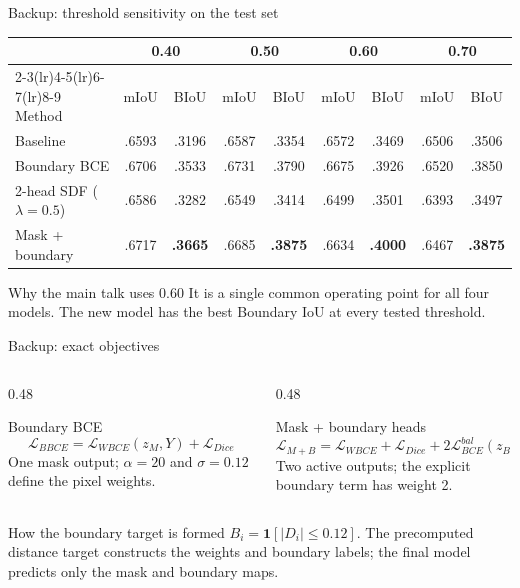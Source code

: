 \documentclass[aspectratio=169,10pt]{beamer}
\begin{document}
\begin{frame}{Backup: threshold sensitivity on the test set}
  \centering
  \small
  \setlength{\tabcolsep}{8pt}
  \begin{tabular}{@{}lcccccccc@{}}
    \toprule
    & \multicolumn{2}{c}{0.40} & \multicolumn{2}{c}{0.50}
    & \multicolumn{2}{c}{0.60} & \multicolumn{2}{c}{0.70} \\
    \cmidrule(lr){2-3}\cmidrule(lr){4-5}\cmidrule(lr){6-7}\cmidrule(lr){8-9}
    Method & mIoU & BIoU & mIoU & BIoU & mIoU & BIoU & mIoU & BIoU \\
    \midrule
    Baseline & .6593 & .3196 & .6587 & .3354 & .6572 & .3469 & .6506 & .3506 \\
    Boundary BCE & .6706 & .3533 & .6731 & .3790 & .6675 & .3926 & .6520 & .3850 \\
    2-head SDF ($\lambda=0.5$) & .6586 & .3282 & .6549 & .3414 & .6499 & .3501 & .6393 & .3497 \\
    Mask + boundary & .6717 & \textbf{.3665} & .6685 & \textbf{.3875} & .6634 & \textbf{.4000} & .6467 & \textbf{.3875} \\
    \bottomrule
  \end{tabular}

  \vspace{0.9em}
  \begin{block}{Why the main talk uses 0.60}
    It is a single common operating point for all four models. The new model has the best Boundary IoU at every tested threshold.
  \end{block}
\end{frame}

\begin{frame}{Backup: exact objectives}
  \begin{columns}[T,onlytextwidth]
    \begin{column}{0.48\textwidth}
      \begin{block}{Boundary BCE}
        \[
          \mathcal{L}_{BBCE}
          = \mathcal{L}_{WBCE}(z_M,Y)
          + \mathcal{L}_{Dice}
        \]
        \small One mask output; $\alpha=20$ and $\sigma=0.12$ define the pixel weights.
      \end{block}
    \end{column}
    \begin{column}{0.48\textwidth}
      \begin{block}{Mask + boundary heads}
        \[
          \mathcal{L}_{M+B}
          = \mathcal{L}_{WBCE}
          + \mathcal{L}_{Dice}
          + 2\mathcal{L}^{bal}_{BCE}(z_B,B)
        \]
        \small Two active outputs; the explicit boundary term has weight 2.
      \end{block}
    \end{column}
  \end{columns}
  \vspace{0.75em}
  \begin{block}{How the boundary target is formed}
    $B_i=\mathbf{1}[|D_i|\leq0.12]$. The precomputed distance target constructs the weights and boundary labels; the final model predicts only the mask and boundary maps.
  \end{block}
\end{frame}
\end{document}
